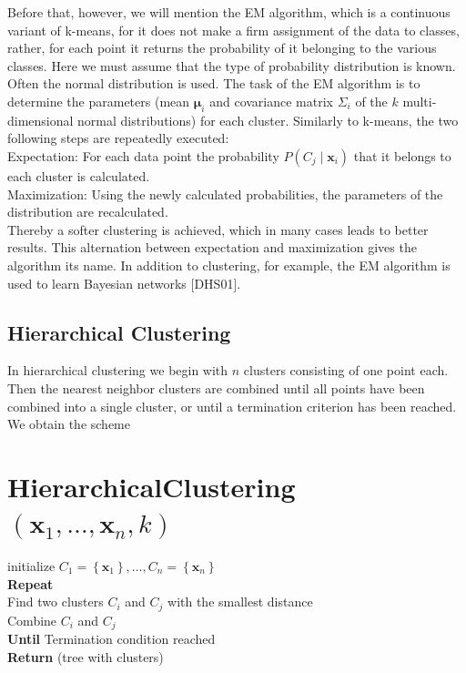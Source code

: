 \documentclass[10pt]{book}
\begin{document}
Before that, however, we will mention the EM algorithm, which is a continuous variant of k-means, for it does not make a firm assignment of the data to classes, rather, for each point it returns the probability of it belonging to the various classes. Here we must assume that the type of probability distribution is known. Often the normal distribution is used. The task of the EM algorithm is to determine the parameters (mean $\boldsymbol{\mu}_{i}$ and covariance matrix $\Sigma_{i}$ of the $k$ multi-dimensional normal distributions) for each cluster. Similarly to k-means, the two following steps are repeatedly executed:\\
Expectation: For each data point the probability $P\left(C_{j} \mid \boldsymbol{x}_{i}\right)$ that it belongs to each cluster is calculated.\\
Maximization: Using the newly calculated probabilities, the parameters of the distribution are recalculated.\\[0pt]
Thereby a softer clustering is achieved, which in many cases leads to better results. This alternation between expectation and maximization gives the algorithm its name. In addition to clustering, for example, the EM algorithm is used to learn Bayesian networks [DHS01].

\subsection{Hierarchical Clustering}
In hierarchical clustering we begin with $n$ clusters consisting of one point each. Then the nearest neighbor clusters are combined until all points have been combined into a single cluster, or until a termination criterion has been reached. We obtain the scheme

\section{HierarchicalClustering $\left(\boldsymbol{x}_{1}, \ldots, \boldsymbol{x}_{n}, k\right)$}
initialize $C_{1}=\left\{\boldsymbol{x}_{1}\right\}, \ldots, C_{n}=\left\{\boldsymbol{x}_{n}\right\}$\\
\textbf{Repeat}\\
Find two clusters $C_{i}$ and $C_{j}$ with the smallest distance\\
Combine $C_{i}$ and $C_{j}$\\
\textbf{Until} Termination condition reached\\
\textbf{Return} (tree with clusters)
\end{document}
